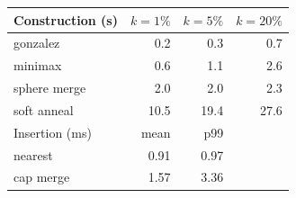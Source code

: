 \begin{tabular}{@{}lrrr@{}}
\toprule
Construction (s) & $k=1\%$ & $k=5\%$ & $k=20\%$ \\
\midrule
gonzalez & 0.2 & 0.3 & 0.7 \\
minimax & 0.6 & 1.1 & 2.6 \\
sphere merge & 2.0 & 2.0 & 2.3 \\
soft anneal & 10.5 & 19.4 & 27.6 \\
\midrule
Insertion (ms) & mean & p99 & \\
\midrule
nearest & 0.91 & 0.97 & \\
cap merge & 1.57 & 3.36 & \\
\bottomrule
\end{tabular}
